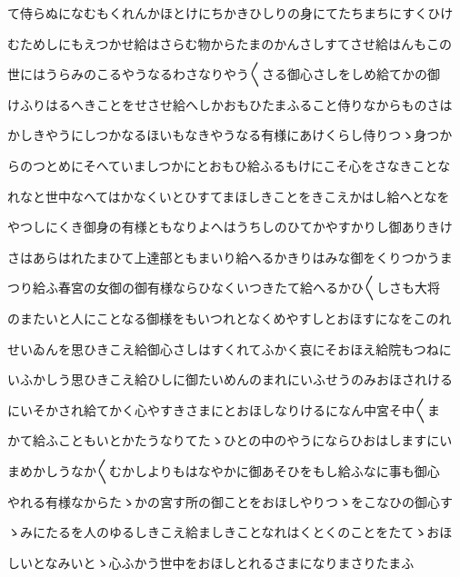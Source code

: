 \documentclass[a4paper,11pt,landscape]{ltjtarticle}
\begin{document}
て侍らぬになむもくれんかほとけにちかきひしりの身にてたちまちにすくひけ
\par\medskip
むためしにもえつかせ給はさらむ物からたまのかんさしすてさせ給はんもこの
\par\medskip
世にはうらみのこるやうなるわさなりやう〱さる御心さしをしめ給てかの御
\par\medskip
けふりはるへきことをせさせ給へしかおもひたまふること侍りなからものさは
\par\medskip
かしきやうにしつかなるほいもなきやうなる有様にあけくらし侍りつゝ身つか
\par\medskip
らのつとめにそへていましつかにとおもひ給ふるもけにこそ心をさなきことな
\par\medskip
れなと世中なへてはかなくいとひすてまほしきことをきこえかはし給へとなを
\par\medskip
やつしにくき御身の有様ともなりよへはうちしのひてかやすかりし御ありきけ
\par\medskip
さはあらはれたまひて上達部ともまいり給へるかきりはみな御をくりつかうま
\par\medskip
つり給ふ春宮の女御の御有様ならひなくいつきたて給へるかひ〱しさも大将
\par\medskip
のまたいと人にことなる御様をもいつれとなくめやすしとおほすになをこのれ
\par\medskip
せいゐんを思ひきこえ給御心さしはすくれてふかく哀にそおほえ給院もつねに
\par\medskip
いふかしう思ひきこえ給ひしに御たいめんのまれにいふせうのみおほされける
\par\medskip
にいそかされ給てかく心やすきさまにとおほしなりけるになん中宮そ中〱ま
\par\medskip
かて給ふこともいとかたうなりてたゝひとの中のやうにならひおはしますにい
\par\medskip
まめかしうなか〱むかしよりもはなやかに御あそひをもし給ふなに事も御心
\par\medskip
やれる有様なからたゝかの宮す所の御ことをおほしやりつゝをこなひの御心す
\par\medskip
ゝみにたるを人のゆるしきこえ給ましきことなれはくとくのことをたてゝおほ
\par\medskip
しいとなみいとゝ心ふかう世中をおほしとれるさまになりまさりたまふ
\par\medskip
\end{document}
